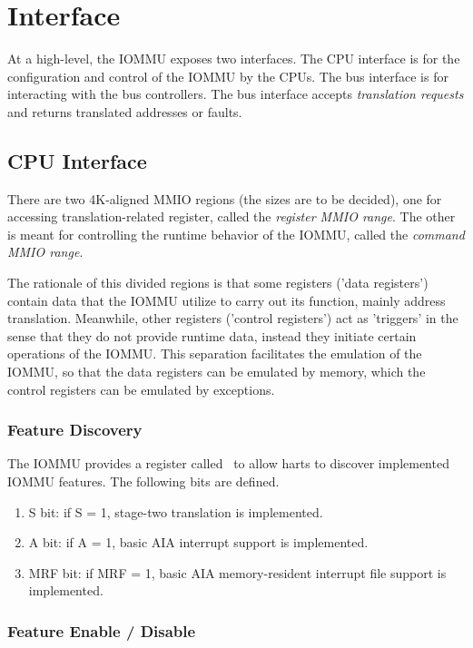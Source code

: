 \section{Interface}

At a high-level, the IOMMU exposes two interfaces. The CPU interface is for the
configuration and control of the IOMMU by the CPUs. The bus interface is for interacting
with the bus controllers. The bus interface accepts \textit{translation requests} and
returns translated addresses or faults.

\subsection{CPU Interface}

There are two 4K-aligned MMIO regions (the sizes are to be decided), one for accessing
translation-related register, called the \textit{register MMIO range}. The other is meant
for controlling the runtime behavior of the IOMMU, called the \textit{command MMIO range}.

The rationale of this divided regions is that some registers ('data registers') contain
data that the IOMMU utilize to carry out its function, mainly address translation.
Meanwhile, other registers ('control registers') act as 'triggers' in the sense that they
do not provide runtime data, instead they initiate certain operations of the IOMMU. This
separation facilitates the emulation of the IOMMU, so that the data registers can be
emulated by memory, which the control registers can be emulated by exceptions.

\subsubsection{Feature Discovery}

The IOMMU provides a register called \iommucap\ to allow harts to discover implemented
IOMMU features. The following bits are defined.

\begin{enumerate}
    \item S  bit: if S = 1, stage-two translation is implemented.
    \item A  bit: if A = 1, basic AIA interrupt support is implemented.
    \item MRF  bit: if MRF = 1, basic AIA memory-resident interrupt file support is implemented.
\end{enumerate}

\subsubsection{Feature Enable / Disable}

